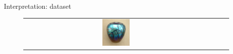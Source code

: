 \documentclass[10pt]{beamer}
\begin{document}
\begin{frame}{Interpretation: dataset}
\begin{figure}[!htbp]
\begin{tabular}{*{4}{c}}
\includegraphics[width=0.15\textwidth]{interp/real_world_img/vase/vase}
\end{tabular}
\end{figure}

\end{frame}
\end{document}
